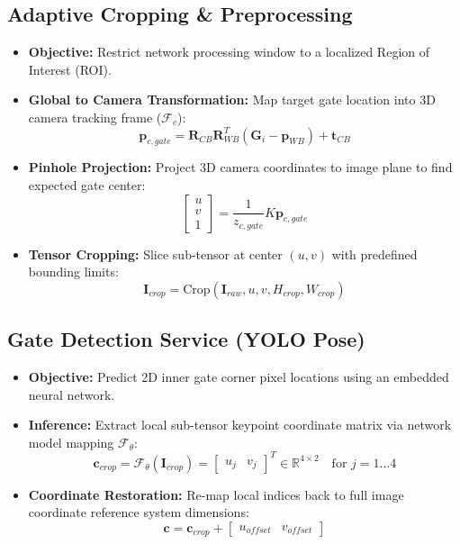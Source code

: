 \documentclass{article}
\begin{document}
\vspace{10pt}
\subsection{Adaptive Cropping \& Preprocessing}
\begin{itemize}
    \item \textbf{Objective:} Restrict network processing window to a localized Region of Interest (ROI).
    \item \textbf{Global to Camera Transformation:} Map target gate location into 3D camera tracking frame ($\mathcal{F}_c$):
    $$\mathbf{p}_{c, gate} = \mathbf{R}_{CB} \mathbf{R}_{WB}^T (\mathbf{G}_i - \mathbf{p}_{WB}) + \mathbf{t}_{CB}$$
    \item \textbf{Pinhole Projection:} Project 3D camera coordinates to image plane to find expected gate center:
    $$\begin{bmatrix} u \\ v \\ 1 \end{bmatrix} = \frac{1}{z_{c, gate}} K \mathbf{p}_{c, gate}$$
    \item \textbf{Tensor Cropping:} Slice sub-tensor at center $(u, v)$ with predefined bounding limits:
    $$\mathbf{I}_{crop} = \text{Crop}(\mathbf{I}_{raw}, u, v, H_{crop}, W_{crop})$$
\end{itemize}

\subsection{Gate Detection Service (YOLO Pose)}
\begin{itemize}
    \item \textbf{Objective:} Predict 2D inner gate corner pixel locations using an embedded neural network.
    \item \textbf{Inference:} Extract local sub-tensor keypoint coordinate matrix via network model mapping $\mathcal{F}_{\theta}$:
    $$\mathbf{c}_{crop} = \mathcal{F}_{\theta}(\mathbf{I}_{crop}) = \begin{bmatrix} u_j & v_j \end{bmatrix}^T \in \mathbb{R}^{4 \times 2} \quad \text{for } j = 1 \dots 4$$
    \item \textbf{Coordinate Restoration:} Re-map local indices back to full image coordinate reference system dimensions:
    $$\mathbf{c} = \mathbf{c}_{crop} + \begin{bmatrix} u_{offset} & v_{offset} \end{bmatrix}$$
\end{itemize}
\end{document}
